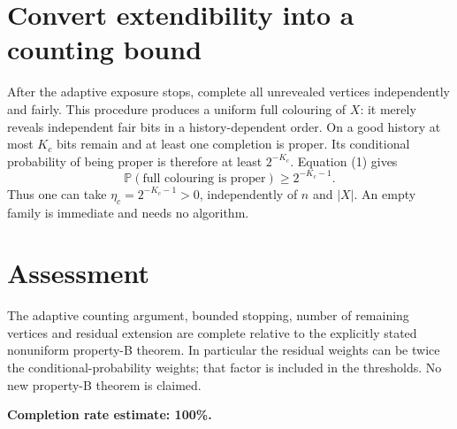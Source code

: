 \documentclass[11pt]{article}
\begin{document}
\section*{Convert extendibility into a counting bound}
After the adaptive exposure stops, complete all unrevealed vertices independently and fairly. This procedure produces a uniform full colouring of $X$: it merely reveals independent fair bits in a history-dependent order. On a good history at most $K_c$ bits remain and at least one completion is proper. Its conditional probability of being proper is therefore at least $2^{-K_c}$. Equation (1) gives
\[
 \mathbb P(\text{full colouring is proper})\ge2^{-K_c-1}.
\]
Thus one can take $\eta_c=2^{-K_c-1}>0$, independently of $n$ and $|X|$. An empty family is immediate and needs no algorithm.

\section*{Assessment}
The adaptive counting argument, bounded stopping, number of remaining vertices and residual extension are complete relative to the explicitly stated nonuniform property-B theorem. In particular the residual weights can be twice the conditional-probability weights; that factor is included in the thresholds. No new property-B theorem is claimed.

\textbf{Completion rate estimate: 100\%.}
\end{document}
